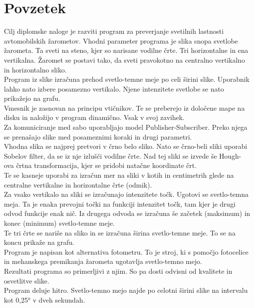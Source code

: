 \documentclass[oneside, a4paper, 12pt]{book}
\renewcommand{\chaptermark}[1]%
{\markboth{\MakeUppercase{\thechapter.\ #1}}{}} \renewcommand{\sectionmark}[1]%
\newcommand{\clearemptydoublepage}{\newpage{\pagestyle{empty}\cleardoublepage}}
\begin{document}
\clearemptydoublepage

\def\thepage{}%
\tableofcontents{}


\clearemptydoublepage

\chapter*{Povzetek}
\chaptermark{}
Cilj diplomske naloge je razviti program za preverjanje svetilnih lastnosti avtomobilskih žarometov. Vhodni parameter programa je slika snopa svetlobe žarometa. Ta sveti na steno, kjer so narisane vodilne črte. Tri horizontalne in ena vertikalna. Žaromet se postavi tako, da sveti pravokotno na centralno vertikalno in horizontalno sliko. \\
Program iz slike izračuna prehod svetlo-temne meje po celi širini slike. Uporabnik lahko nato izbere posamezno vertikalo. Njene intenzitete svetlobe se nato prikažejo na grafu.\\
Vmesnik je zasnovan na principu vtičnikov. Te se preberejo iz določene mape na disku in naložijo v program dinamično. Vsak v svoj zavihek.\\
Za komuniciranje med sabo uporabljajo model Publisher-Subscriber. Preko njega se prenašajo slike med posameznimi koraki in drugi parametri.\\
Vhodna slika se najprej pretvori v črno belo sliko. Nato se črno-beli sliki uporabi Sobelov filter, da se iz nje izlušči vodilne črte. Nad tej sliki se izvede še Hough-ova črtna transformacija, kjer se pridobi natačne koordinate črt.\\
Te se kasneje uporabi za izračun mer na sliki v kotih in centimetrih glede na centralne vertikalne in horizontalne črte (odmik).\\
Za vsako vertikalo na sliki se izračunajo intenzitete točk. Ugotovi se svetlo-temna meja. Ta je enaka prevojni točki na funkciji intenzitet točk, tam kjer je drugi odvod funkcije enak nič. Iz drugega odvoda se izračuna še začetek (maksimum) in konec (minimum) svetlo-temne meje.\\
Te tri črte se nariše na sliko in se izračuna širina svetlo-temne meje. To se na koncu prikaže na grafu.\\
Program je napisan kot alternativa fotometru. To je stroj, ki s pomočjo fotocelice in mehanskega premikanja žarometa ugotavlja svetlo-temno mejo.\\
Rezultati programa so primerljivi z njim. So pa dosti odvisni od kvalitete in osvetlitve slike.\\
Program deluje hitro. Svetlo-temno mejo najde po celotni širini slike na intervalu kot 0,25° v dveh sekundah.
\clearemptydoublepage
\end{document}
